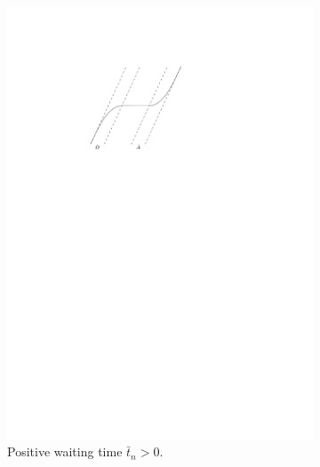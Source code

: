 \documentclass[a4paper]{article}
\theoremstyle{definition}
\theoremstyle{plain}
\begin{document}
\begin{figure}[t]
  \centering
\begin{subfigure}{0.4\textwidth}
    \includegraphics[scale=1]{figures/motion/single_trajectory_split}
    \caption{Positive waiting time $\bar{t}_{n} > 0$.}
    \label{fig:single_trajectory_split}
\end{subfigure}
\hfill
\begin{subfigure}{0.3\textwidth}

\end{subfigure}
\end{figure}
\end{document}
